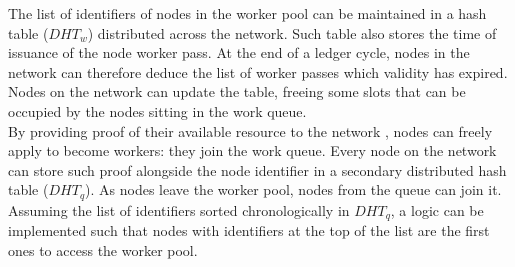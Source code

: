 The list of identifiers of nodes in the worker pool can be maintained in a hash table ($DHT_w$) distributed across the network. Such table also stores the time of issuance of the node worker pass. At the end of a ledger cycle, nodes in the network can therefore deduce the list of worker passes which validity has expired. Nodes on the network can update the table, freeing some slots that can be occupied by the nodes sitting in the work queue. \\

By providing proof of their available resource to the network \cite{coremark,pos}, nodes can freely apply to become workers: they join the work queue. Every node on the network can store such proof alongside the node identifier in a secondary distributed hash table ($DHT_q$). As nodes leave the worker pool, nodes from the queue can join it. Assuming the list of identifiers sorted chronologically in $DHT_q$, a logic can be implemented such that nodes with identifiers at the top of the list are the first ones to access the worker pool. \\

